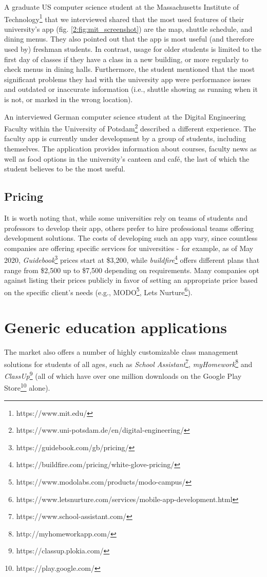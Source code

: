         A graduate US computer science student at the Massachusetts Institute of Technology\footnote{https://www.mit.edu/} that we interviewed shared that the most used features of their university's app (fig. \ref{2:fig:mit_screenshot}) are the map, shuttle schedule, and dining menus. They also pointed out that the app is most useful (and therefore used by) freshman students. In contrast, usage for older students is limited to the first day of classes if they have a class in a new building, or more regularly to check menus in dining halls. Furthermore, the student mentioned that the most significant problems they had with the university app were performance issues and outdated or inaccurate information (i.e., shuttle showing as running when it is not, or marked in the wrong location).
        
        An interviewed German computer science student at the Digital Engineering Faculty within the University of Potsdam\footnote{https://www.uni-potsdam.de/en/digital-engineering/} described a different experience. The faculty app is currently under development by a group of students, including themselves. The application provides information about courses, faculty news as well as food options in the university's canteen and café, the last of which the student believes to be the most useful.
        
    \subsection{Pricing} \label{2:uni_apps_pricing}
    
        It is worth noting that, while some universities rely on teams of students and professors to develop their app, others prefer to hire professional teams offering development solutions. The costs of developing such an app vary, since countless companies are offering specific services for universities - for example, as of May 2020, \textit{Guidebook}\footnote{https://guidebook.com/gb/pricing/} prices start at \$3,200, while \textit{buildfire}\footnote{https://buildfire.com/pricing/white-glove-pricing/} offers different plans that range from \$2,500 up to \$7,500 depending on requirements. Many companies opt against listing their prices publicly in favor of setting an appropriate price based on the specific client's needs (e.g., MODO\footnote{https://www.modolabs.com/products/modo-campus/}, Lets Nurture\footnote{https://www.letsnurture.com/services/mobile-app-development.html}).

\section{Generic education applications} \label{2:generic_apps}
    The market also offers a number of highly customizable class management solutions for students of all ages, such as \textit{School Assistant}\footnote{https://www.school-assistant.com/}, \textit{myHomework}\footnote{http://myhomeworkapp.com/} and \textit{ClassUp}\footnote{https://classup.plokia.com/} (all of which have over one million downloads on the Google Play Store\footnote{https://play.google.com/} alone).
    
